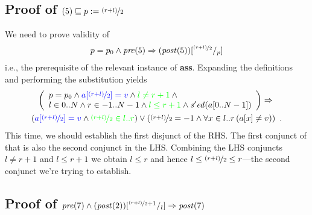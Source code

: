 \documentclass[headings=small,a4paper,12pt]{scrartcl}
\newcommand{\sorted}[3]{\mathit{s'ed}(#1[#2..#3])}
\newcommand{\pre}{\mathit{pre}}
\newcommand{\post}{\mathit{post}}
\begin{document}
\subsection{Proof of $(5)\sqsubseteq p\mathrel{:=} \nicefrac{(r+l)}2$}
\label{sec:proof5ass}

We need to prove validity of
\begin{gather*}
  p=p_0\And\pre(5) \Implies (\post(5))\subst{\nicefrac{(r+l)}2}p
\end{gather*}
i.e., the prerequisite of the relevant instance of \textbf{ass}.
Expanding the definitions and performing the substitution yields
\begin{gather*}
  \left(
    \begin{array}{l}
      p=p_0\And {\color{blue}a[\nicefrac{(r+l)}2]=v} \And {\color{green}l\neq r+1}\And{}\\
      l\in 0..N\And r\in -1..N-1\And {\color{green}l\leq r+1} \And \sorted a0{N-1}
    \end{array}
  \right) \Implies{}\\
  ({\color{blue}a[\nicefrac{(r+l)}2]=v}\And {\color{green}\nicefrac{(r+l)}2\in l..r})\Or
  (\nicefrac{(r+l)}2=-1\And\All{x\in l..r}{a[x]\neq v})\enskip.
\end{gather*}
This time, we should establish the first disjunct of the RHS. The
first conjunct of that is also the second conjunct in the LHS.
Combining the LHS conjuncts $l\neq r+1$ and $l\leq r+1$ we obtain
$l\leq r$ and hence $l\leq \nicefrac{(r+l)}2 \leq r$---the second
conjunct we're trying to establish.


\subsection{Proof of $\pre(7)\And (\post(2))\subst{\nicefrac{(r+l)}2+1}l\Implies \post(7)$}
\label{sec:proof7post}
\end{document}
